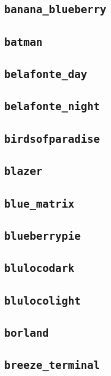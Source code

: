 \subsection{\texttt{banana\_blueberry}}
\newpage
\subsection{\texttt{batman}}
\newpage
\subsection{\texttt{belafonte\_day}}
\newpage
\subsection{\texttt{belafonte\_night}}
\newpage
\subsection{\texttt{birdsofparadise}}
\newpage
\subsection{\texttt{blazer}}
\newpage
\subsection{\texttt{blue\_matrix}}
\newpage
\subsection{\texttt{blueberrypie}}
\newpage
\subsection{\texttt{blulocodark}}
\newpage
\subsection{\texttt{blulocolight}}
\newpage
\subsection{\texttt{borland}}
\newpage
\subsection{\texttt{breeze\_terminal}}
\newpage
